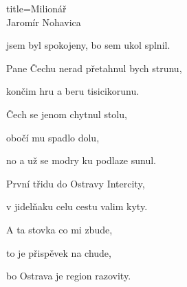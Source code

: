\begin{song}{title=\predtitle\centering Milionář \\\large Jaromír Nohavica  \vspace*{-0.3cm}}
\begin{centerjustified}
\begin{varwidth}[t]{0.5\textwidth}
jsem byl spokojeny, bo sem ukol splnil.

\sloka
Pane Čechu nerad přetahnul bych strunu,

končim hru a beru tisicikorunu.

Čech se jenom chytnul stolu,

obočí mu spadlo dolu,

no a už se modry ku podlaze sunul.

\sloka
První třidu do Ostravy Intercity,

v jidelňaku celu cestu valim kyty.

A ta stovka co mi zbude,

to je přispěvek na chude,

bo Ostrava je region razovity.


\end{varwidth}
\end{centerjustified}
\setcounter{Slokočet}{0}
\end{song}
